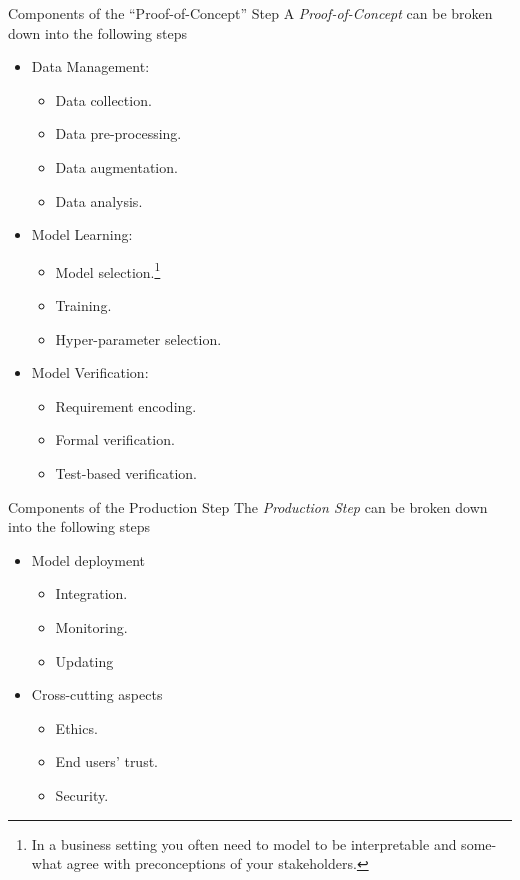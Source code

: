 \documentclass[11pt,a4paper]{article}
\begin{document}
  \begin{proposition}{Components of the ``Proof-of-Concept'' Step}
    A \textit{Proof-of-Concept} can be broken down into the following steps
    \begin{itemize}
      \item Data Management:
      \begin{itemize}
        \item Data collection.
        \item Data pre-processing.
        \item Data augmentation.
        \item Data analysis.
      \end{itemize}
      \item Model Learning:
      \begin{itemize}
        \item Model selection.\footnote{In a business setting you often need to model to be interpretable and some-what agree with preconceptions of your stakeholders.}
        \item Training.
        \item Hyper-parameter selection.
      \end{itemize}
      \item Model Verification:
      \begin{itemize}
        \item Requirement encoding.
        \item Formal verification.
        \item Test-based verification.
      \end{itemize}
    \end{itemize}
  \end{proposition}

  \begin{proposition}{Components of the Production Step}
    The \textit{Production Step} can be broken down into the following steps
    \begin{itemize}
      \item Model deployment
      \begin{itemize}
        \item Integration.
        \item Monitoring.
        \item Updating
      \end{itemize}
      \item Cross-cutting aspects
      \begin{itemize}
        \item Ethics.
        \item End users' trust.
        \item Security.
      \end{itemize}
    \end{itemize}
  \end{proposition}
\end{document}
